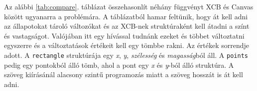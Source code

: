
Az alábbi \ref{tab:compare}. táblázat összehasonlít néhány függvényt XCB és Canvas között ugyanarra a problémára. A táblázatból hamar feltünik, hogy át kell adni az állapotokat tároló változókat és az XCB-nek struktúraként kell átadni a színt és vastagságot. Valójában itt egy hívással tudnánk ezeket és többet változtatni egyszerre és a változtatások értékeit kell egy tömbbe rakni. Az értékek sorrendje adott. A \texttt{rectangle} struktúrája egy \textit{x}, \textit{y}, \textit{szélesség} és \textit{magasság}ból áll. A \texttt{points} pedig egy pontokból álló tömb, ahol a pont egy \textit{x} és \textit{y}-ból álló struktúra. A szöveg kiírásánál alacsony szintű programozás miatt a szöveg hosszát is át kell adni.

